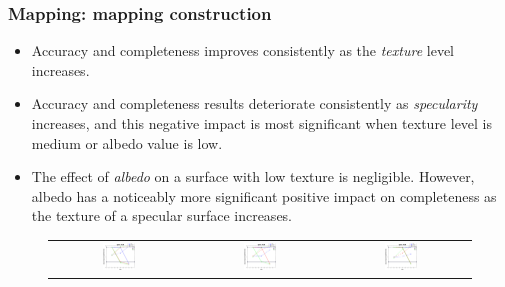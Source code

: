 \documentclass{beamer}
\begin{document}
\begin{frame}
\frametitle{Mapping: mapping construction}

\begin{itemize}
\item Accuracy and completeness improves consistently as the \textit{texture} level increases. 
\item Accuracy and completeness results deteriorate consistently as \textit{specularity} increases, and this negative impact is most significant when texture level is medium or albedo value is low. 
\item The effect of \textit{albedo} on a surface with low texture is negligible. However, albedo has a noticeably more significant positive impact on completeness as the texture of a specular surface increases.
\end{itemize}

\begin{figure}[!htbp]
\begin{tabular}{ccc}
\includegraphics[width=0.25\textwidth]{mapping/training/mvs_train_spec_02}&
\includegraphics[width=0.25\textwidth]{mapping/training/mvs_train_spec_05}&
\includegraphics[width=0.25\textwidth]{mapping/training/mvs_train_spec_08}\\
\end{tabular}
\end{figure}

\end{frame}
\end{document}

